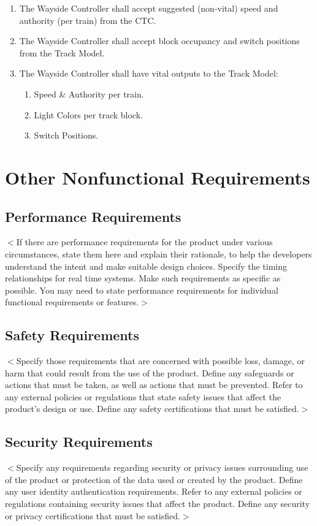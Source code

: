 \documentclass{scrreprt}
\begin{document}
\begin{enumerate}
    \item The Wayside Controller shall accept suggested (non-vital) speed and authority (per train) from the CTC.
    \item The Wayside Controller shall accept block occupancy and switch positions from the Track Model.
    \item The Wayside Controller shall have vital outputs to the Track Model:
        \begin{enumerate}
            \item Speed \& Authority per train.
            \item Light Colors per track block.
            \item Switch Positions.
            \end{enumerate}
\end{enumerate}

\chapter{Other Nonfunctional Requirements}

\section{Performance Requirements}
$<$If there are performance requirements for the product under various 
circumstances, state them here and explain their rationale, to help the 
developers understand the intent and make suitable design choices. Specify the 
timing relationships for real time systems. Make such requirements as specific 
as possible. You may need to state performance requirements for individual 
functional requirements or features.$>$

\section{Safety Requirements}
$<$Specify those requirements that are concerned with possible loss, damage, or 
harm that could result from the use of the product. Define any safeguards or 
actions that must be taken, as well as actions that must be prevented. Refer to 
any external policies or regulations that state safety issues that affect the 
product’s design or use. Define any safety certifications that must be 
satisfied.$>$

\section{Security Requirements}
$<$Specify any requirements regarding security or privacy issues surrounding use 
of the product or protection of the data used or created by the product. Define 
any user identity authentication requirements. Refer to any external policies or 
regulations containing security issues that affect the product. Define any 
security or privacy certifications that must be satisfied.$>$
\end{document}
